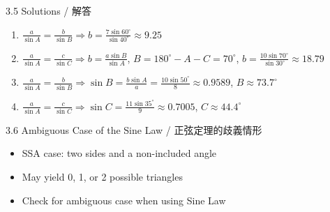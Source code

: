 \documentclass[aspectratio=169]{beamer}
\begin{document}
\begin{frame}{3.5 Solutions / 解答}
    \begin{tcolorbox}[colback=lightgray,colframe=accent,title=Solutions]
        \footnotesize
        \begin{enumerate}
            \item $\frac{a}{\sin A} = \frac{b}{\sin B} \Rightarrow b = \frac{7 \sin 60^\circ}{\sin 40^\circ} \approx 9.25$
            \item $\frac{a}{\sin A} = \frac{c}{\sin C} \Rightarrow b = \frac{a \sin B}{\sin A}$, $B = 180^\circ - A - C = 70^\circ$, $b = \frac{10 \sin 70^\circ}{\sin 30^\circ} \approx 18.79$
            \item $\frac{a}{\sin A} = \frac{b}{\sin B} \Rightarrow \sin B = \frac{b \sin A}{a} = \frac{10 \sin 50^\circ}{8} \approx 0.9589$, $B \approx 73.7^\circ$
            \item $\frac{a}{\sin A} = \frac{c}{\sin C} \Rightarrow \sin C = \frac{11 \sin 35^\circ}{9} \approx 0.7005$, $C \approx 44.4^\circ$
        \end{enumerate}
    \end{tcolorbox}
\end{frame}

\begin{frame}{3.6 Ambiguous Case of the Sine Law / 正弦定理的歧義情形}
    \begin{tcolorbox}[colback=lightgray,colframe=primary,title=Key Points]
        \footnotesize
        \begin{itemize}
            \item SSA case: two sides and a non-included angle
            \item May yield 0, 1, or 2 possible triangles
            \item Check for ambiguous case when using Sine Law
        \end{itemize}
    \end{tcolorbox}
    \vspace{0.5em}
    \begin{center}
    \end{center}
\end{frame}
\end{document}
